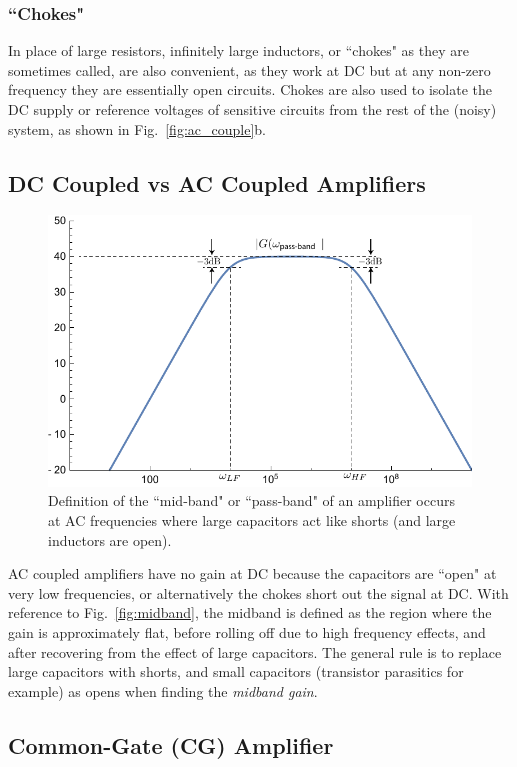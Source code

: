 \subsubsection{``Chokes"}

In place of large resistors, infinitely large inductors, or ``chokes" as they are sometimes called, are also convenient, as they work at DC but at any non-zero frequency they are essentially open circuits.  Chokes are also used to isolate the DC supply or reference voltages of sensitive circuits from the rest of the (noisy) system, as shown in Fig.~\ref{fig:ac_couple}b.
 


\subsection{DC Coupled vs AC Coupled Amplifiers}

\begin{figure}[tb]
\begin{center}
\includegraphics[width=.6\columnwidth]{amp_bandpass}
\end{center}
\caption{Definition of the ``mid-band" or ``pass-band" of an amplifier occurs at AC frequencies where large capacitors act like shorts (and large inductors are open).} \label{fig:cgamp_is}
\end{figure}

AC coupled amplifiers have no gain at DC because the capacitors are ``open" at very low frequencies, or alternatively the chokes short out the signal at DC.  With reference to Fig.~\ref{fig:midband}, the midband is defined as the region where the gain is approximately flat, before rolling off due to high frequency effects, and after recovering from the effect of large capacitors. The general rule is to replace large capacitors with shorts, and small capacitors (transistor parasitics for example) as opens when finding the \emph{midband gain}. 

 


\subsection{Common-Gate (CG) Amplifier}

